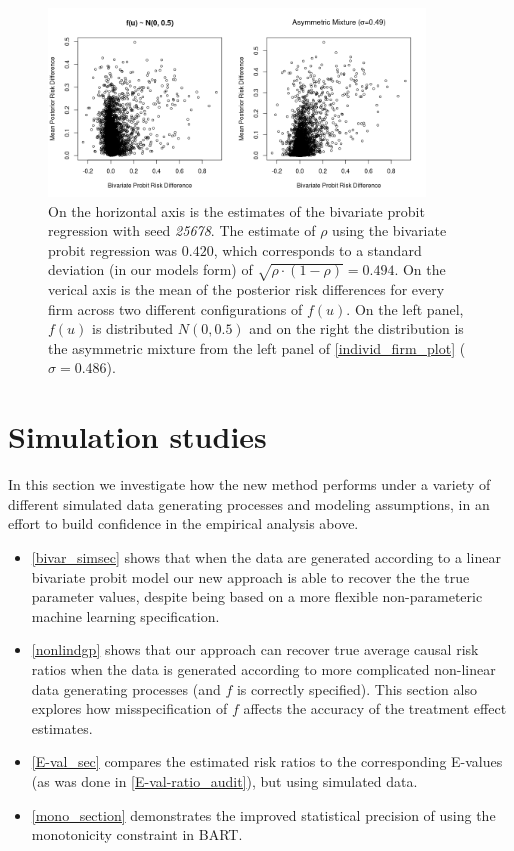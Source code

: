 \documentclass[aoas,preprint, 11pt, dvipsnames, table, x11name]{imsart}
\theoremstyle{remark}
\begin{document}
	\begin{figure}[t]
		\centering
		\includegraphics[width=10cm]{RD_bivar_vs_methods.png}
		\caption{On the horizontal axis is the estimates of the bivariate probit regression with seed \emph{25678}. The estimate of $\rho$ using the bivariate probit regression was $0.420$, which corresponds to a standard deviation (in our models form) of $\sqrt{\rho\cdot(1-\rho)}=0.494$. On the verical axis is the mean of the posterior risk differences for every firm across two different configurations of $f(u)$.  On the left panel, $f(u)$ is distributed $N(0, 0.5)$ and on the right the distribution is the asymmetric mixture from the left panel of \autoref{individ_firm_plot} ($\sigma=0.486$).}  
		\label{fig:bivar_vs_our}
	\end{figure}

	\section{Simulation studies}\label{sim_study}
	In this section we investigate how the new method performs under a variety of different simulated data generating processes and modeling assumptions, in an effort to build confidence in the empirical analysis above. 
	\begin{itemize}
	\item \autoref{bivar_simsec} shows that when the data are generated according to a linear bivariate probit model our new approach is able to recover the the true parameter values, despite being based on a more flexible non-parameteric machine learning specification.	
	\item \autoref{nonlindgp} shows that our approach can recover true average causal risk ratios when the data is generated according to more complicated non-linear data generating processes (and $f$ is correctly specified). This section also explores how misspecification of $f$ affects the accuracy of the treatment effect estimates.    
	\item \autoref{E-val_sec} compares the estimated risk ratios to the corresponding E-values (as was done in \autoref{E-val-ratio_audit}), but using simulated data.
	\item   \autoref{mono_section} demonstrates the improved statistical precision of using the monotonicity constraint in BART.
	\end{itemize}
	
\end{document}
